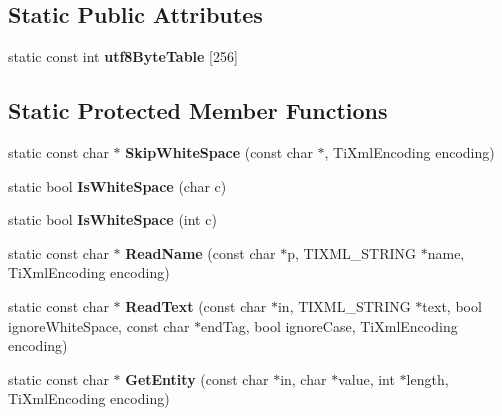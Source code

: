 \subsection*{\-Static \-Public \-Attributes}
\begin{DoxyCompactItemize}
\item 
static const int {\bfseries utf8\-Byte\-Table} \mbox{[}256\mbox{]}
\end{DoxyCompactItemize}
\subsection*{\-Static \-Protected \-Member \-Functions}
\begin{DoxyCompactItemize}
\item 
\hypertarget{class_ti_xml_base_ac0c3d66d8a9e6996a1fa016275e16875}{
static const char $\ast$ {\bfseries \-Skip\-White\-Space} (const char $\ast$, \-Ti\-Xml\-Encoding encoding)}
\label{class_ti_xml_base_ac0c3d66d8a9e6996a1fa016275e16875}

\item 
\hypertarget{class_ti_xml_base_af56296d561c0bab4bc8e198cdcf5c48e}{
static bool {\bfseries \-Is\-White\-Space} (char c)}
\label{class_ti_xml_base_af56296d561c0bab4bc8e198cdcf5c48e}

\item 
\hypertarget{class_ti_xml_base_a3de391ea9f4c4a8aa10d04480b048795}{
static bool {\bfseries \-Is\-White\-Space} (int c)}
\label{class_ti_xml_base_a3de391ea9f4c4a8aa10d04480b048795}

\item 
\hypertarget{class_ti_xml_base_a1c21a6ab5f7b503acd91f35f183734b3}{
static const char $\ast$ {\bfseries \-Read\-Name} (const char $\ast$p, \-T\-I\-X\-M\-L\-\_\-\-S\-T\-R\-I\-N\-G $\ast$name, \-Ti\-Xml\-Encoding encoding)}
\label{class_ti_xml_base_a1c21a6ab5f7b503acd91f35f183734b3}

\item 
\hypertarget{class_ti_xml_base_aa646c74921aa33156968b802bbf5566e}{
static const char $\ast$ {\bfseries \-Read\-Text} (const char $\ast$in, \-T\-I\-X\-M\-L\-\_\-\-S\-T\-R\-I\-N\-G $\ast$text, bool ignore\-White\-Space, const char $\ast$end\-Tag, bool ignore\-Case, \-Ti\-Xml\-Encoding encoding)}
\label{class_ti_xml_base_aa646c74921aa33156968b802bbf5566e}

\item 
\hypertarget{class_ti_xml_base_ac5c08bf3deffcda0bf8ce2958372b584}{
static const char $\ast$ {\bfseries \-Get\-Entity} (const char $\ast$in, char $\ast$value, int $\ast$length, \-Ti\-Xml\-Encoding encoding)}
\label{class_ti_xml_base_ac5c08bf3deffcda0bf8ce2958372b584}


\end{DoxyCompactItemize}
